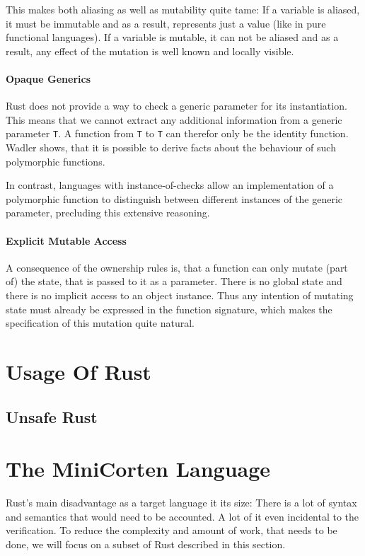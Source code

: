\documentclass{article}
\newcommand{\code}[1]{\texttt{#1}}
\begin{document}
This makes both aliasing as well as mutability quite tame:
If a variable is aliased, it must be immutable and as a result, represents just a value (like in pure functional languages).
If a variable is mutable, it can not be aliased and as a result, any effect of the mutation is well known and locally visible.

\paragraph*{Opaque Generics} Rust does not provide a way to check a generic parameter for its instantiation. This means that we cannot extract any additional information from a generic parameter \code{T}. A function from \code{T} to \code{T} can therefor only be the identity function.
Wadler \cite{wadler_theorems_1989} shows, that it is possible to derive facts about the behaviour of such polymorphic functions.

In contrast, languages with instance-of-checks allow an implementation of a polymorphic function to distinguish between different instances of the generic parameter, precluding this extensive reasoning.

\paragraph*{Explicit Mutable Access} A consequence of the ownership rules is, that a function can only mutate (part of) the state, that is passed to it as a parameter. There is no global state and there is no implicit access to an object instance. Thus any intention of mutating state must already be expressed in the function signature, which makes the specification of this mutation quite natural.

\section{Usage Of Rust}

\label{ss:unsafe-rust}\subsection{Unsafe Rust}

\section{The MiniCorten Language}

Rust's main disadvantage as a target language it its size: There is a lot of syntax and semantics that would need to be accounted. A lot of it even incidental to the verification. To reduce the complexity and amount of work, that needs to be done, we will focus on a subset of Rust described in this section.
\end{document}
